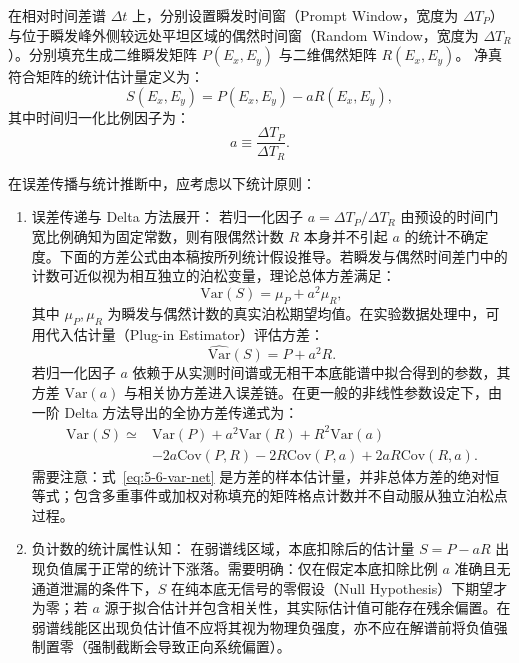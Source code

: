 在相对时间差谱 $\Delta t$ 上，分别设置瞬发时间窗（Prompt Window，宽度为 $\Delta T_P$）与位于瞬发峰外侧较远处平坦区域的偶然时间窗（Random Window，宽度为 $\Delta T_R$）。分别填充生成二维瞬发矩阵 $P(E_x, E_y)$ 与二维偶然矩阵 $R(E_x, E_y)$。
净真符合矩阵的统计估计量定义为：
\begin{equation}\label{eq:5-6-prompt-random}
S(E_x, E_y) = P(E_x, E_y) - a R(E_x, E_y),
\end{equation}
其中时间归一化比例因子为：
\begin{equation}\label{eq:5-6-norm-factor}
a \equiv \frac{\Delta T_P}{\Delta T_R}.
\end{equation}

在误差传播与统计推断中，应考虑以下统计原则：
\begin{enumerate}
\item 误差传递与 Delta 方法展开：
若归一化因子 $a = \Delta T_P / \Delta T_R$ 由预设的时间门宽比例确知为固定常数，则有限偶然计数 $R$ 本身并不引起 $a$ 的统计不确定度。下面的方差公式由本稿按所列统计假设推导。若瞬发与偶然时间差门中的计数可近似视为相互独立的泊松变量，理论总体方差满足：
\begin{equation}\label{eq:5-6-var-population}
\mathrm{Var}(S) = \mu_P + a^2 \mu_R,
\end{equation}
其中 $\mu_P, \mu_R$ 为瞬发与偶然计数的真实泊松期望均值。在实验数据处理中，可用代入估计量（Plug-in Estimator）评估方差：
\begin{equation}\label{eq:5-6-var-net}
\widehat{\mathrm{Var}}(S) = P + a^2 R.
\end{equation}
若归一化因子 $a$ 依赖于从实测时间谱或无相干本底能谱中拟合得到的参数，其方差 $\mathrm{Var}(a)$ 与相关协方差进入误差链。在更一般的非线性参数设定下，由一阶 Delta 方法导出的全协方差传递式为：
\begin{equation}\label{eq:5-6-var-cov-expanded}
\begin{aligned}
\mathrm{Var}(S)\simeq{}&\mathrm{Var}(P)+a^2\mathrm{Var}(R)+R^2\mathrm{Var}(a)\\
&-2a\mathrm{Cov}(P,R)-2R\mathrm{Cov}(P,a)+2aR\mathrm{Cov}(R,a).
\end{aligned}
\end{equation}
需要注意：式~\eqref{eq:5-6-var-net} 是方差的样本估计量，并非总体方差的绝对恒等式；包含多重事件或加权对称填充的矩阵格点计数并不自动服从独立泊松点过程。
\item 负计数的统计属性认知：
在弱谱线区域，本底扣除后的估计量 $S = P - aR$ 出现负值属于正常的统计下涨落。需要明确：仅在假定本底扣除比例 $a$ 准确且无通道泄漏的条件下，$S$ 在纯本底无信号的零假设（Null Hypothesis）下期望才为零；若 $a$ 源于拟合估计并包含相关性，其实际估计值可能存在残余偏置。在弱谱线能区出现负估计值不应将其视为物理负强度，亦不应在解谱前将负值强制置零（强制截断会导致正向系统偏置）。
\end{enumerate}

